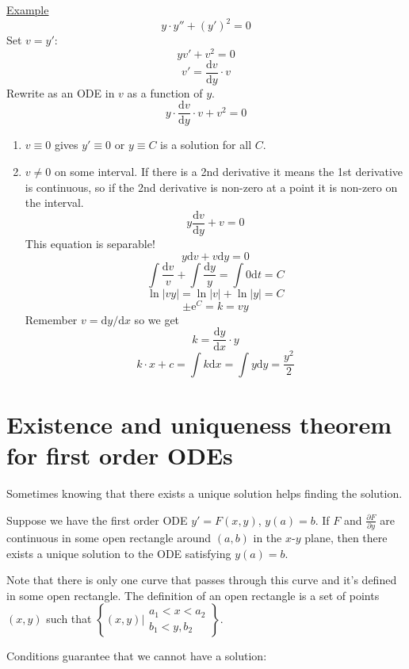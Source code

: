 \documentclass{article}
\newcommand{\mathd}{\mathrm{d}}
\newcommand{\mathe}{\mathrm{e}}
\newenvironment{enumeratenumeric}{\begin{enumerate}[1.] }{\end{enumerate}}
\begin{document}
{\underline{Example}}
\[ y \cdot y'' + (y')^2 = 0 \]
Set $v = y'$:
\[ yv' + v^2 = 0 \]
\[ v' = \frac{\mathd v}{\mathd y} \cdot v \]
Rewrite as an ODE in $v$ as a function of $y$.
\[ y \cdot \frac{\mathd v}{\mathd y} \cdot v + v^2 = 0 \]
\begin{enumeratenumeric}
  \item $v \equiv 0$ gives $y' \equiv 0$ or $y \equiv C$ is a solution for all
  $C$.
  
  \item $v \neq 0$ on some interval. If there is a 2nd derivative it means the
  1st derivative is continuous, so if the 2nd derivative is non-zero at a
  point it is non-zero on the interval.
  \[ y \frac{\mathd v}{\mathd y} + v = 0 \]
  This equation is separable!
  \[ y \mathd v + v \mathd y = 0 \]
  \[ \int \frac{\mathd v}{v} + \int \frac{\mathd y}{y} = \int 0 \mathd t = C
  \]
  \[ \ln | vy | = \ln | v | + \ln | y | = C \]
  \[ \pm \mathe^C = k = vy \]
  Remember $v = \mathd y / \mathd x$ so we get
  \[ k = \frac{\mathd y}{\mathd x} \cdot y \]
  \[ k \cdot x + c = \int k \mathd x = \int y \mathd y = \frac{y^2}{2} \]
\end{enumeratenumeric}
\section{Existence and uniqueness theorem for first
order ODEs}

Sometimes knowing that there exists a unique solution helps finding the
solution.

Suppose we have the first order ODE $y' = F (x, y)$, $y (a) = b$. If $F$ and
$\frac{\partial F}{\partial y}$ are continuous in some open rectangle around
$(a, b)$ in the $x$-$y$ plane, then there exists a unique solution to the ODE
satisfying $y (a) = b$.

Note that there is only one curve that passes through this curve and it's
defined in some open rectangle. The definition of an open rectangle is a set
of points $(x, y)$ such that {$\left\{ (x, y) | \begin{array}{l}
  a_1 < x < a_2\\
  b_1 < y, b_2
\end{array} \right\}$}.

Conditions guarantee that we cannot have a solution:

\begin{center}
\end{center}
\end{document}
